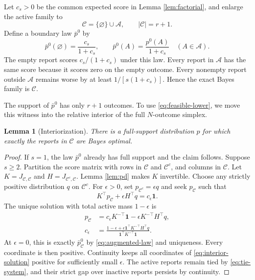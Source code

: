 \documentclass[twoside]{article}
\newtheorem{lemma}[theorem]{Lemma}
\newcommand{\1}{\mathbf 1}
\begin{document}
Let $c_s>0$ be the common expected score in Lemma \ref{lem:factorial}, and enlarge the active family to
\begin{equation}
\mathcal C=\{\varnothing\}\cup\mathcal A,
\qquad |\mathcal C|=r+1.
\end{equation}
Define a boundary law $\bar p^0$ by
\begin{equation}
\bar p^0(\varnothing)=\frac{c_s}{1+c_s},
\qquad
\bar p^0(A)=\frac{p^0(A)}{1+c_s}\quad(A\in\mathcal A).
\label{eq:augmented-law}
\end{equation}
The empty report scores $c_s/(1+c_s)$ under this law. Every report in $\mathcal A$ has the same score because it scores zero on the empty outcome. Every nonempty report outside $\mathcal A$ remains worse by at least $1/[s(1+c_s)]$. Hence the exact Bayes family is $\mathcal C$.

The support of $\bar p^0$ has only $r+1$ outcomes. To use \eqref{eq:feasible-lower}, we move this witness into the relative interior of the full $N$-outcome simplex.

\begin{lemma}[Interiorization]
\label{lem:interior}
There is a full-support distribution $p$ for which exactly the reports in $\mathcal C$ are Bayes optimal.
\end{lemma}

\begin{proof}
If $s=1$, the law $\bar p^0$ already has full support and the claim follows. Suppose $s\geq2$. Partition the score matrix with rows in $\mathcal C$ and $\mathcal C^c$, and columns in $\mathcal C$. Let $K=J_{\mathcal C,\mathcal C}$ and $H=J_{\mathcal C^c,\mathcal C}$. Lemma \ref{lem:pd} makes $K$ invertible. Choose any strictly positive distribution $q$ on $\mathcal C^c$. For $\epsilon>0$, set $p_{\mathcal C^c}=\epsilon q$ and seek $p_{\mathcal C}$ such that
\begin{equation}
K^\top p_{\mathcal C}+\epsilon H^\top q=c_\epsilon\1.
\label{eq:tie-system}
\end{equation}
The unique solution with total active mass $1-\epsilon$ is
\begin{align}
p_{\mathcal C}&=c_\epsilon K^{-\top}\1-\epsilon K^{-\top}H^\top q,\label{eq:interior-solution}\\
c_\epsilon&=\frac{1-\epsilon+\epsilon\1^\top K^{-\top}H^\top q}{\1^\top K^{-\top}\1}.
\end{align}
At $\epsilon=0$, this is exactly $\bar p^0_{\mathcal C}$ by \eqref{eq:augmented-law} and uniqueness. Every coordinate is then positive. Continuity keeps all coordinates of \eqref{eq:interior-solution} positive for sufficiently small $\epsilon$. The active reports remain tied by \eqref{eq:tie-system}, and their strict gap over inactive reports persists by continuity.
\end{proof}
\end{document}
